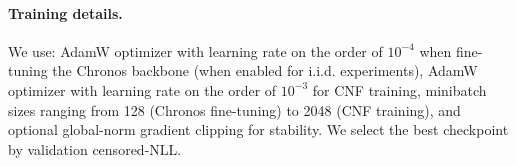 \documentclass[11pt]{article}
\begin{document}
\paragraph{Training details.}
We use: AdamW optimizer with learning rate on the order of $10^{-4}$ when fine-tuning the Chronos backbone (when enabled for i.i.d. experiments), AdamW optimizer with learning rate on the order of $10^{-3}$ for CNF training,  minibatch sizes ranging from 128 (Chronos fine-tuning) to 2048 (CNF training), and optional global-norm gradient clipping for stability. We select the best checkpoint by validation censored-NLL.
\end{document}
